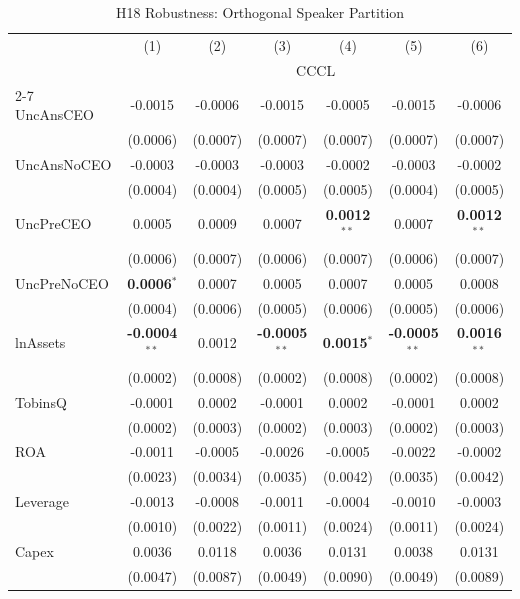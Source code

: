\begin{landscape}
\begin{table}[H]
\setlength{\tabcolsep}{3pt}
\renewcommand{\arraystretch}{0.85}
\centering
\caption{H18 Robustness: Orthogonal Speaker Partition}
\label{tab:h18_robust}
\scriptsize
\begin{tabular}{lcccccc}
\toprule
 & (1) & (2) & (3) & (4) & (5) & (6) \\
 & \multicolumn{6}{c}{CCCL} \\
\cmidrule(lr){2-7}
\midrule
UncAnsCEO & -0.0015 & -0.0006 & -0.0015 & -0.0005 & -0.0015 & -0.0006 \\
 & (0.0006) & (0.0007) & (0.0007) & (0.0007) & (0.0007) & (0.0007) \\
UncAnsNoCEO & -0.0003 & -0.0003 & -0.0003 & -0.0002 & -0.0003 & -0.0002 \\
 & (0.0004) & (0.0004) & (0.0005) & (0.0005) & (0.0004) & (0.0005) \\
UncPreCEO & 0.0005 & 0.0009 & 0.0007 & \textbf{0.0012}$^{**}$ & 0.0007 & \textbf{0.0012}$^{**}$ \\
 & (0.0006) & (0.0007) & (0.0006) & (0.0007) & (0.0006) & (0.0007) \\
UncPreNoCEO & \textbf{0.0006}$^{*}$ & 0.0007 & 0.0005 & 0.0007 & 0.0005 & 0.0008 \\
 & (0.0004) & (0.0006) & (0.0005) & (0.0006) & (0.0005) & (0.0006) \\
\midrule
lnAssets & \textbf{-0.0004}$^{**}$ & 0.0012 & \textbf{-0.0005}$^{**}$ & \textbf{0.0015}$^{*}$ & \textbf{-0.0005}$^{**}$ & \textbf{0.0016}$^{**}$ \\
 & (0.0002) & (0.0008) & (0.0002) & (0.0008) & (0.0002) & (0.0008) \\
TobinsQ & -0.0001 & 0.0002 & -0.0001 & 0.0002 & -0.0001 & 0.0002 \\
 & (0.0002) & (0.0003) & (0.0002) & (0.0003) & (0.0002) & (0.0003) \\
ROA & -0.0011 & -0.0005 & -0.0026 & -0.0005 & -0.0022 & -0.0002 \\
 & (0.0023) & (0.0034) & (0.0035) & (0.0042) & (0.0035) & (0.0042) \\
Leverage & -0.0013 & -0.0008 & -0.0011 & -0.0004 & -0.0010 & -0.0003 \\
 & (0.0010) & (0.0022) & (0.0011) & (0.0024) & (0.0011) & (0.0024) \\
Capex & 0.0036 & 0.0118 & 0.0036 & 0.0131 & 0.0038 & 0.0131 \\
 & (0.0047) & (0.0087) & (0.0049) & (0.0090) & (0.0049) & (0.0089) \\

\end{tabular}
\end{table}
\end{landscape}
